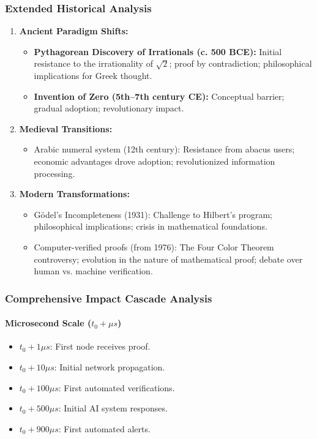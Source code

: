 \documentclass[11pt]{article}
\begin{document}
\subsubsection{Extended Historical Analysis}

\begin{enumerate}[label=(\arabic*)]
    \item \textbf{Ancient Paradigm Shifts:}
    \begin{itemize}
        \item \textbf{Pythagorean Discovery of Irrationals (c. 500 BCE):} Initial resistance to the irrationality of $\sqrt{2}$; proof by contradiction; philosophical implications for Greek thought.
        \item \textbf{Invention of Zero (5th--7th century CE):} Conceptual barrier; gradual adoption; revolutionary impact.
    \end{itemize}
    \item \textbf{Medieval Transitions:}
    \begin{itemize}
        \item Arabic numeral system (12th century): Resistance from abacus users; economic advantages drove adoption; revolutionized information processing.
    \end{itemize}
    \item \textbf{Modern Transformations:}
    \begin{itemize}
        \item Gödel's Incompleteness (1931): Challenge to Hilbert's program; philosophical implications; crisis in mathematical foundations.
        \item Computer-verified proofs (from 1976): The Four Color Theorem controversy; evolution in the nature of mathematical proof; debate over human vs. machine verification.
    \end{itemize}
\end{enumerate}

\subsubsection{Comprehensive Impact Cascade Analysis}

\paragraph{Microsecond Scale \quad ($t_0+\mu s$)}
\begin{itemize}
    \item $t_0+1\mu s$: First node receives proof.
    \item $t_0+10\mu s$: Initial network propagation.
    \item $t_0+100\mu s$: First automated verifications.
    \item $t_0+500\mu s$: Initial AI system responses.
    \item $t_0+900\mu s$: First automated alerts.
\end{itemize}
\end{document}

